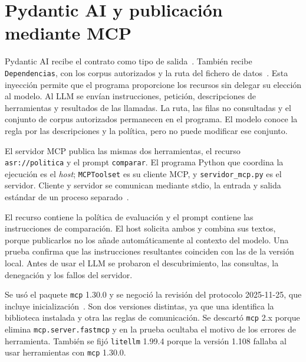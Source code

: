 \section{Pydantic AI y publicación mediante MCP}

Pydantic AI recibe el contrato como tipo de salida~\cite{pydanticOutput}. También recibe \texttt{Dependencias}, con los corpus autorizados y la ruta del fichero de datos~\cite{pydanticDeps}. Esta inyección permite que el programa proporcione los recursos sin delegar su elección al modelo. Al LLM se envían instrucciones, petición, descripciones de herramientas y resultados de las llamadas. La ruta, las filas no consultadas y el conjunto de corpus autorizados permanecen en el programa. El modelo conoce la regla por las descripciones y la política, pero no puede modificar ese conjunto.

El servidor MCP publica las mismas dos herramientas, el recurso \texttt{asr://politica} y el prompt \texttt{comparar}. El programa Python que coordina la ejecución es el \emph{host}; \texttt{MCPToolset} es su cliente MCP, y \texttt{servidor\_mcp.py} es el servidor. Cliente y servidor se comunican mediante stdio, la entrada y salida estándar de un proceso separado~\cite{pydanticMCP}.

El recurso contiene la política de evaluación y el prompt contiene las instrucciones de comparación. El host solicita ambos y combina sus textos, porque publicarlos no los añade automáticamente al contexto del modelo. Una prueba confirma que las instrucciones resultantes coinciden con las de la versión local. Antes de usar el LLM se probaron el descubrimiento, las consultas, la denegación y los fallos del servidor.

Se usó el paquete \texttt{mcp} 1.30.0 y se negoció la revisión del protocolo 2025-11-25, que incluye inicialización~\cite{mcpLifecycle,mcpPython}. Son dos versiones distintas, ya que una identifica la biblioteca instalada y otra las reglas de comunicación. Se descartó \texttt{mcp} 2.x porque elimina \texttt{mcp.server.fastmcp} y en la prueba ocultaba el motivo de los errores de herramienta. También se fijó \texttt{litellm} 1.99.4 porque la versión 1.108 fallaba al usar herramientas con \texttt{mcp} 1.30.0.
